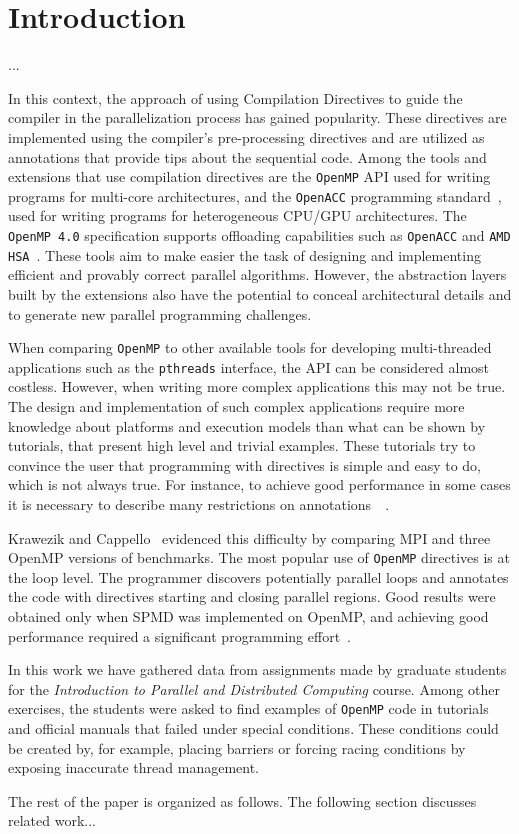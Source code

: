 \section{Introduction}
\label{sec:introduction}

...

In this context, the approach of using Compilation Directives to guide the
compiler in the parallelization process has gained popularity. These directives
are implemented using the compiler's pre-processing directives and are utilized
as annotations that provide tips about the sequential code. Among the tools and
extensions that use compilation directives are the \texttt{OpenMP} API
\cite{Dagum1998a} \cite{Chapman:2007} used for writing programs for multi-core
architectures, and the \texttt{OpenACC} programming
standard~\cite{openacc:api}, used for writing programs for heterogeneous
CPU/GPU architectures. The \texttt{OpenMP 4.0} specification supports
offloading capabilities \cite{openmp:api:2013} such as \texttt{OpenACC} and
\texttt{AMD HSA}~\cite{amd:hsa:site}. These tools aim to make easier the task
of designing and implementing efficient and provably correct parallel
algorithms. However, the abstraction layers built by the extensions also have
the potential to conceal architectural details and to generate new parallel
programming challenges.

When comparing \texttt{OpenMP} to other available tools for developing
multi-threaded applications such as the \texttt{pthreads} interface, the API
can be considered almost costless. However, when writing more complex
applications this may not be true. The design and implementation of such
complex applications require more knowledge about platforms and execution
models than what can be shown by tutorials, that present high level and trivial
examples. These tutorials try to convince the user that programming with
directives is simple and easy to do, which is not always true. For instance, to
achieve good performance in some cases it is necessary to describe many
restrictions on annotations~\cite{OpenMPTasks2009}~\cite{mattson2003good}.

Krawezik and Cappello~\cite{CPE:CPE905} evidenced this difficulty by comparing
MPI and three OpenMP versions of benchmarks. The most popular use of
\texttt{OpenMP} directives is at the loop level. The programmer discovers
potentially parallel loops and annotates the code with directives starting and
closing parallel regions. Good results were obtained only when SPMD was
implemented on OpenMP, and achieving good performance required a significant
programming effort~\cite{CPE:CPE905}.

In this work we have gathered data from assignments made by graduate students
for the \emph{Introduction to Parallel and Distributed Computing} course. Among
other exercises, the students were asked to find examples of \texttt{OpenMP}
code in tutorials and official manuals that failed under special conditions.
These conditions could be created by, for example, placing barriers or forcing
racing conditions by exposing inaccurate thread management.


The rest of the paper is organized as follows. The following section discusses
related work... 

